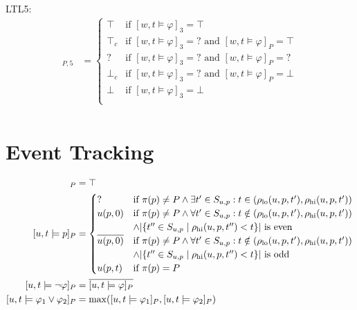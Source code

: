 \documentclass[envcountsame, runningheads]{llncs}
\def\until{\,\mathcal{U}\,}
\def\since{\,\mathcal{S}\,}
\newcommand{\?}{\text{?}}
\newcommand{\suchthat}{\;\ifnum\currentgrouptype=16 \middle\fi|\;}
\let\st\suchthat
\begin{document}
	LTL5:
	\begin{align*}
		[w,t \models \varphi]_{P,5} &= \begin{cases}
			\top &\text{if } [w,t \models \varphi]_3 = \top \\
			\top_c &\text{if } [w,t \models \varphi]_3 = \? \text{ and } [w,t \models \varphi]_P = \top \\
			? &\text{if } [w,t \models \varphi]_3 = \? \text{ and } [w,t \models \varphi]_P = \? \\
			\bot_c &\text{if } [w,t \models \varphi]_3 = \? \text{ and } [w,t \models \varphi]_P = \bot \\
			\bot &\text{if } [w,t \models \varphi]_3 = \bot \\
		\end{cases} \\
	\end{align*}	


	
	\newpage
	
	
	\newpage
	
	\section{Event Tracking}
	
	\begin{align*}
		[u,t \models \texttt{true}]_P &= \top \\
		[u,t \models p]_P &= \begin{cases}
			? &\text{if } \pi(p) \not = P \land \exists t' \in S_{u,p} : t \in (\rho_{\text{lo}}(u, p, t'), \rho_{\text{hi}}(u, p, t')) \\
			u(p,0) &\text{if } \pi(p) \not = P \land \forall t' \in S_{u,p} : t \notin (\rho_{\text{lo}}(u, p, t'), \rho_{\text{hi}}(u, p, t')) \\
			&\land |\{t'' \in S_{u,p} \st \rho_{\text{hi}}(u, p, t'') < t\}| \text{ is even} \\
			\overline{u(p,0)} &\text{if } \pi(p) \not = P \land \forall t' \in S_{u,p} : t \notin (\rho_{\text{lo}}(u, p, t'), \rho_{\text{hi}}(u, p, t')) \\
			&\land |\{t'' \in S_{u,p} \st \rho_{\text{hi}}(u, p, t'') < t\}| \text{ is odd} \\
			u(p,t) &\text{if } \pi(p) = P \\
		\end{cases} \\
		[u,t \models \lnot \varphi]_P &= \overline{[u,t \models \varphi]_P}\\
		[u,t \models \varphi_1 \lor \varphi_2]_P &= \max([u,t \models \varphi_1]_P, [u,t \models \varphi_2]_P)\\
	\end{align*}
	
	\newpage
	
	
\end{document}
